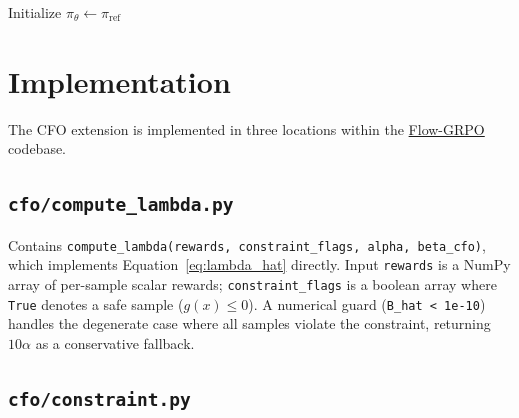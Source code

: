 \documentclass[11pt]{article}
\begin{document}
\begin{algorithm}[H]
\SetAlgoLined
{}
\BlankLine
Initialize $\pi_\theta \leftarrow \pi_{\mathrm{ref}}$\;
\caption{Chance-Constrained Flow Optimization (CFO)}
\end{algorithm}

\section{Implementation}

The CFO extension is implemented in three locations within the
\href{https://github.com/yifan123/flow_grpo}{Flow-GRPO} codebase.

\subsection{\texttt{cfo/compute\_lambda.py}}

Contains \texttt{compute\_lambda(rewards, constraint\_flags, alpha, beta\_cfo)},
which implements Equation~\eqref{eq:lambda_hat} directly. Input \texttt{rewards}
is a NumPy array of per-sample scalar rewards; \texttt{constraint\_flags} is a
boolean array where \texttt{True} denotes a safe sample ($g(x) \le 0$). A
numerical guard (\texttt{B\_hat < 1e-10}) handles the degenerate case where all
samples violate the constraint, returning $10\alpha$ as a conservative fallback.

\subsection{\texttt{cfo/constraint.py}}
\end{document}
